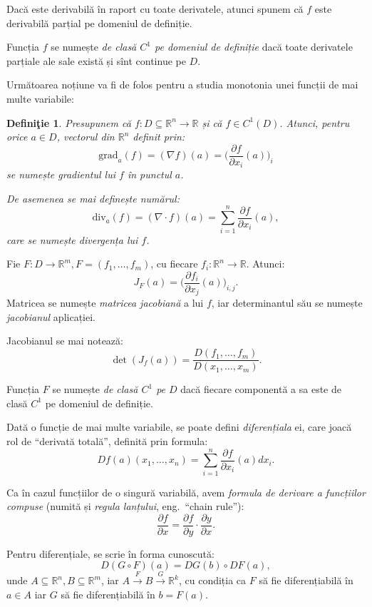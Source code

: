 \documentclass[11pt,a4paper]{article}
\newcommand\qq{\enquote}
\newcommand\seq{\subseteq}
\newcommand\xrar{\xrightarrow}
\newcommand\RR{\mathbb{R}}
\theoremstyle{dotless}
\theoremstyle{dotlessdr}
\newtheorem{definition}{Defini\c{t}ie}[section]
\begin{document}
Dacă este derivabilă în raport cu toate derivatele, atunci spunem că $f$ este derivabilă
parțial pe domeniul de definiție.

Funcția $f$ se numește \emph{de clasă $C^1$ pe domeniul de definiție} dacă toate
derivatele parțiale ale sale există și sînt continue pe $D$.

Următoarea noțiune va fi de folos pentru a studia monotonia unei funcții de mai
multe variabile:
\begin{definition}\label{def:grad}
  Presupunem că $f : D \seq \RR^n \to \RR$ și că $f \in C^1(D)$. Atunci, pentru
  orice $a \in D$, vectorul din $\RR^n$ definit prin:
  \[
    \mathrm{grad}_a(f) = (\nabla f)(a) = \Big( \frac{\partial f}{\partial x_i}(a) \Big)_i
  \]
  se numește \emph{gradientul lui $f$ în punctul $a$}.

  De asemenea se mai definește numărul:
  \[
    \mathrm{div}_a(f) = (\nabla \cdot f)(a) = \sum_{i = 1}^n \frac{\partial f}{\partial x_i} (a),
  \]
  care se numește \emph{divergența} lui $f$.
\end{definition}

Fie $F : D \to \RR^m, F = (f_1, \dots, f_m)$, cu fiecare $f_i : \RR^n \to \RR$. Atunci:
\[
  J_F (a) = \Big( \frac{\partial f_i}{\partial x_j}(a) \Big)_{i, j}.
\]
Matricea se numește \emph{matricea jacobiană} a lui $f$, iar determinantul său
se numește \emph{jacobianul} aplicației.

Jacobianul se mai notează:
\[
  \det(J_f(a)) = \frac{D(f_1, \dots, f_m)}{D(x_1, \dots, x_m)}.
\]

Funcția $F$ se numește \emph{de clasă $C^1$ pe $D$} dacă fiecare componentă
a sa este de clasă $C^1$ pe domeniul de definiție.

Dată o funcție de mai multe variabile, se poate defini \emph{diferențiala} ei,
care joacă rol de \qq{derivată totală}, definită prin formula:
\[
  Df(a)(x_1, \dots, x_n) = \sum_{i = 1}^n \frac{\partial f}{\partial x_i}(a) dx_i.
\]

Ca în cazul funcțiilor de o singură variabilă, avem \emph{formula de derivare a %
  funcțiilor compuse} (numită și \emph{regula lanțului}, eng.\ ``chain rule''):
\[
  \frac{\partial f}{\partial x} = \frac{\partial f}{\partial y} \cdot \frac{\partial y}{\partial x}.
\]

Pentru diferențiale, se scrie în forma cunoscută:
\[
  D(G \circ F)(a) = DG(b) \circ DF(a),
\]
unde $A \seq \RR^n, B \seq \RR^m$, iar $A \xrar{F} B \xrar{G} \RR^k$, cu condiția
ca $F$ să fie diferențiabilă în $a \in A$ iar $G$ să fie diferențiabilă în $b = F(a)$.
\end{document}
